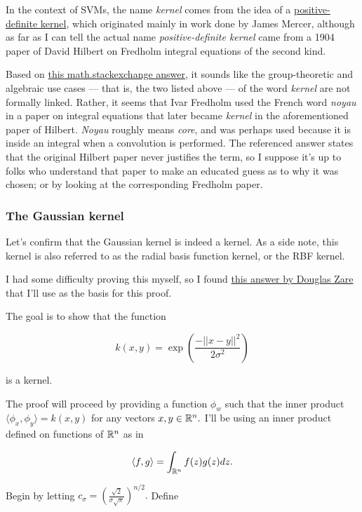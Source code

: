 \documentclass[]{article}
\begin{document}
In the context of SVMs, the name \emph{kernel} comes from the idea of a
\href{https://en.wikipedia.org/wiki/Positive-definite_kernel}{positive-definite
kernel}, which originated mainly in work done by James Mercer, although
as far as I can tell the actual name \emph{positive-definite kernel}
came from a 1904 paper of David Hilbert on Fredholm integral equations
of the second kind.

Based on \href{http://math.stackexchange.com/a/1281138/10785}{this
math.stackexchange answer}, it sounds like the group-theoretic and
algebraic use cases --- that is, the two listed above --- of the word
\emph{kernel} are not formally linked. Rather, it seems that Ivar
Fredholm used the French word \emph{noyau} in a paper on integral
equations that later became \emph{kernel} in the aforementioned paper of
Hilbert. \emph{Noyau} roughly means \emph{core}, and was perhaps used
because it is inside an integral when a convolution is performed. The
referenced answer states that the original Hilbert paper never justifies
the term, so I suppose it's up to folks who understand that paper to
make an educated guess as to why it was chosen; or by looking at the
corresponding Fredholm paper.

\subsubsection{The Gaussian kernel}\label{the-gaussian-kernel}

Let's confirm that the Gaussian kernel is indeed a kernel. As a side
note, this kernel is also referred to as the radial basis function
kernel, or the RBF kernel.

I had some difficulty proving this myself, so I found
\href{http://stats.stackexchange.com/a/35638/123609}{this answer by
Douglas Zare} that I'll use as the basis for this proof.

The goal is to show that the function

\[k(x, y) = \exp\left(\frac{-||x-y||^2}{2\sigma^2}\right)\]

is a kernel.

The proof will proceed by providing a function \(\phi_w\) such that the
inner product \(\langle\phi_x, \phi_y\rangle = k(x, y)\) for any vectors
\(x,y\in\mathbb{R}^n.\) I'll be using an inner product defined on functions of
\(\mathbb{R}^n\) as in

\[\langle f, g\rangle = \int_{\mathbb{R}^n} f(z) g(z) dz.\]

Begin by letting
\(c_\sigma = \left(\frac{\sqrt 2}{\sigma\sqrt\pi}\right)^{n/2}.\) Define
\end{document}
